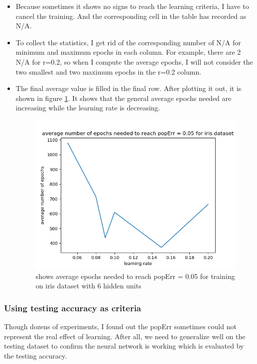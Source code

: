 \documentclass[11pt]{article}
\begin{document}
\begin{itemize}
\item Because sometimes it shows no signs to reach the learning criteria, I have to cancel the training. And the corresponding cell in the table has recorded as N/A.
\item To collect the statistics, I get rid of the corresponding number of N/A for minimum and maximum epochs in each column. For example, there are 2 N/A for r=0.2, so when I compute the average epochs, I will not consider the two smallest and two maximum epochs in the r=0.2 column.
\item The final average value is filled in the final row. After plotting it out, it is shown in figure \ref{fig-average-epochs}. It shows that the general average epochs needed are increasing  while the learning rate is decreasing.
\begin{figure}[htb]
\centering
\includegraphics[width=.9\linewidth]{./average_epochs.png}
\caption{shows average epochs needed to reach popErr = 0.05 for training on iris dataset with 6 hidden units \label{fig-average-epochs}}
\end{figure}
\end{itemize}


\subsubsection{Using testing accuracy as criteria}
\label{sec-3-1-1}
Though dozens of experiments, I found out the popErr sometimes could not represent the real effect of learning. After all, we need to generalize well on the testing dataset to confirm the neural network is working which is evaluated by the testing accuracy.  
\end{document}
